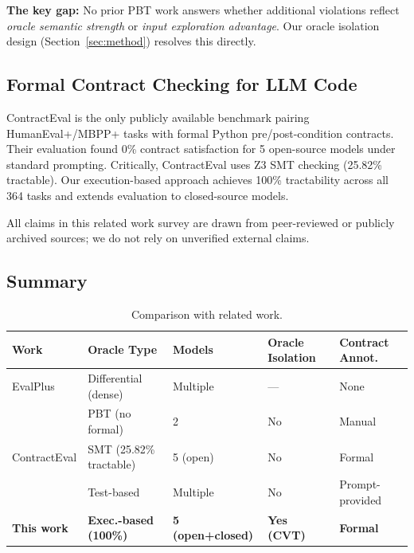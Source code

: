 \textbf{The key gap:} No prior PBT work answers whether additional violations reflect \emph{oracle semantic strength} or \emph{input exploration advantage}. Our oracle isolation design (Section~\ref{sec:method}) resolves this directly.

\subsection{Formal Contract Checking for LLM Code}

ContractEval \citep{Lim2025ContractEval} is the only publicly available benchmark pairing HumanEval+/MBPP+ tasks with formal Python pre/post-condition contracts. Their evaluation found 0\% contract satisfaction for 5 open-source models under standard prompting. Critically, ContractEval uses Z3 SMT checking (25.82\% tractable). Our execution-based approach achieves 100\% tractability across all 364 tasks and extends evaluation to closed-source models.

All claims in this related work survey are drawn from peer-reviewed or publicly archived sources; we do not rely on unverified external claims.

\subsection{Summary}

\begin{table}[h]
\centering
\small
\caption{Comparison with related work.}
\label{tab:related}
\begin{tabular}{lllll}
\toprule
Work & Oracle Type & Models & Oracle Isolation & Contract Annot. \\
\midrule
EvalPlus \citep{Liu2023EvalPlus} & Differential (dense) & Multiple & --- & None \\
\citet{Bose2025Prompts} & PBT (no formal) & 2 & No & Manual \\
ContractEval \citep{Lim2025ContractEval} & SMT (25.82\% tractable) & 5 (open) & No & Formal \\
\citet{Newcomb2025Preconditions} & Test-based & Multiple & No & Prompt-provided \\
\textbf{This work} & \textbf{Exec.-based (100\%)} & \textbf{5 (open+closed)} & \textbf{Yes (CVT)} & \textbf{Formal} \\
\bottomrule
\end{tabular}
\end{table}
